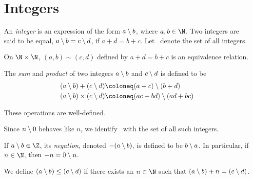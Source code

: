\section{Integers} \label{sec:Z}
\begin{definition*}
    An \emph{integer} is an expression of the form $a \setminus b$, where
    $a, b \in \N$.
    Two integers are said to be equal, $a \setminus b = c \setminus d$, if
    $a + d = b + c$.
    Let \Z\ denote the set of all integers.
\end{definition*}
\begin{exercise}
    On $\N \times \N$, $(a, b) \sim (c, d)$ defined by $a + d = b + c$
    is an equivalence relation.
\end{exercise}

\begin{definition}
    The \emph{sum} and \emph{product} of two integers $a \setminus b$ and
    $c \setminus d$ is defined to be \begin{align*}
        (a \lm b) + (c \lm d) &\coloneq (a + c) \lm (b + d) \\
        (a \lm b) \times (c \lm d) &\coloneq (ac + bd) \lm (ad + bc)
    \end{align*}
\end{definition}

\begin{proposition}
    These operations are well-defined.
\end{proposition}
Since $n \setminus 0$ behaves like $n$, we identify \N\ with the set of all such
integers.
\begin{definition}
    If $a \lm b \in \Z$, its \emph{negation}, denoted $-(a \setminus b)$, is
    defined to be $b \setminus a$.
    In particular, if $n \in \N$, then $-n = 0 \setminus n$.
\end{definition}
\begin{definition}
    We define $(a \setminus b) \le (c \setminus d)$ if there exists an $n \in \N$ such
    that $(a \setminus b) + n = (c \setminus d)$.
\end{definition}

\begin{lemma}[Trichotomy] \label{thm:Z:trichotomy}
    
\end{lemma}

